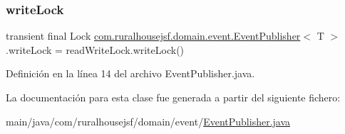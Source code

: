 \mbox{\label{classcom_1_1ruralhousejsf_1_1domain_1_1event_1_1_event_publisher_a1ed2aa95b3bceee1d543a0d0d7297171}} 
\subsubsection{\texorpdfstring{writeLock}{writeLock}}
{\footnotesize\ttfamily transient final Lock \mbox{\hyperlink{classcom_1_1ruralhousejsf_1_1domain_1_1event_1_1_event_publisher}{com.\+ruralhousejsf.\+domain.\+event.\+Event\+Publisher}}$<$ T $>$.write\+Lock = read\+Write\+Lock.\+write\+Lock()\hspace{0.3cm}{\ttfamily [protected]}}



Definición en la línea 14 del archivo Event\+Publisher.\+java.



La documentación para esta clase fue generada a partir del siguiente fichero\+:\begin{DoxyCompactItemize}
\item 
main/java/com/ruralhousejsf/domain/event/\mbox{\hyperlink{_event_publisher_8java}{Event\+Publisher.\+java}}\end{DoxyCompactItemize}
